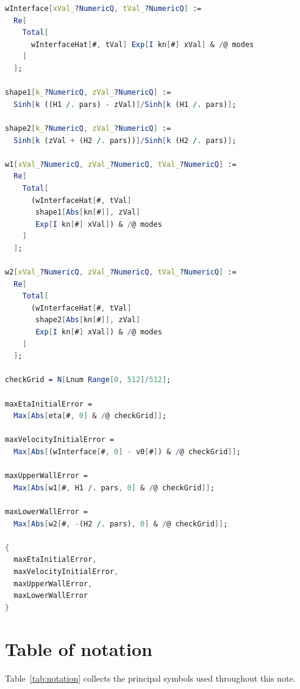 \documentclass[11pt,a4paper]{article}
\begin{document}
\begin{lstlisting}[style=MathematicaStyle,language=Mathematica]
wInterface[xVal_?NumericQ, tVal_?NumericQ] :=
  Re[
    Total[
      wInterfaceHat[#, tVal] Exp[I kn[#] xVal] & /@ modes
    ]
  ];

shape1[k_?NumericQ, zVal_?NumericQ] :=
  Sinh[k ((H1 /. pars) - zVal)]/Sinh[k (H1 /. pars)];

shape2[k_?NumericQ, zVal_?NumericQ] :=
  Sinh[k (zVal + (H2 /. pars))]/Sinh[k (H2 /. pars)];

w1[xVal_?NumericQ, zVal_?NumericQ, tVal_?NumericQ] :=
  Re[
    Total[
      (wInterfaceHat[#, tVal]
       shape1[Abs[kn[#]], zVal]
       Exp[I kn[#] xVal]) & /@ modes
    ]
  ];

w2[xVal_?NumericQ, zVal_?NumericQ, tVal_?NumericQ] :=
  Re[
    Total[
      (wInterfaceHat[#, tVal]
       shape2[Abs[kn[#]], zVal]
       Exp[I kn[#] xVal]) & /@ modes
    ]
  ];

checkGrid = N[Lnum Range[0, 512]/512];

maxEtaInitialError =
  Max[Abs[eta[#, 0] & /@ checkGrid]];

maxVelocityInitialError =
  Max[Abs[(wInterface[#, 0] - v0[#]) & /@ checkGrid]];

maxUpperWallError =
  Max[Abs[w1[#, H1 /. pars, 0] & /@ checkGrid]];

maxLowerWallError =
  Max[Abs[w2[#, -(H2 /. pars), 0] & /@ checkGrid]];

{
  maxEtaInitialError,
  maxVelocityInitialError,
  maxUpperWallError,
  maxLowerWallError
}
\end{lstlisting}

\section{Table of notation}

Table~\ref{tab:notation} collects the principal symbols used throughout this note.
\end{document}
